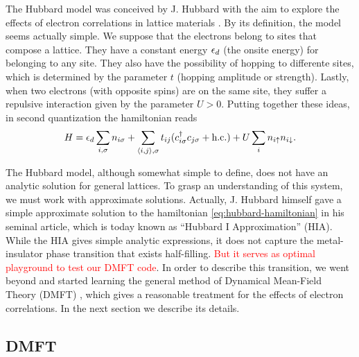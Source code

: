 \documentclass[12pt]{report}
\newcommand{\ALERT}[1]{\textcolor{red}{#1}}
\begin{document}
The Hubbard model was conceived by J. Hubbard with the aim to explore the effects of electron correlations in lattice materials \cite{hubbard1963}. By its definition, the model seems actually simple. We suppose that the electrons belong to sites that compose a lattice. They have a constant energy $\epsilon_d$ (the onsite energy) for belonging to any site. They also have the possibility of hopping to differente sites, which is determined by the parameter $t$ (hopping amplitude or strength). Lastly, when two electrons (with opposite spins) are on the same site, they suffer a repulsive interaction given by the parameter $U > 0$. %
Putting together these ideas, in second quantization the hamiltonian reads
\begin{equation} \label{eq:hubbard-hamiltonian}
H = \epsilon_d \sum_{i, {\sigma}} n_{i{\sigma}} +  \sum_{\left\langle i , j \right\rangle, {\sigma}} t_{ij} (c_{i{\sigma}}^\dagger c_{j{\sigma}} + {\text{h.c.}})
+ U \sum_{i} n_{i{\uparrow}} n_{i{\downarrow}}.
\end{equation}



The Hubbard model, although somewhat simple to define, does not have an analytic solution for general lattices. To grasp an understanding of this system, we must work with approximate solutions. Actually, J. Hubbard himself gave a simple approximate solution to the hamiltonian \ref{eq:hubbard-hamiltonian} in his seminal article, which is today known as ``Hubbard I Approximation'' (HIA). While the HIA gives simple analytic expressions, it does not capture the metal-insulator phase transition that exists half-filling. \ALERT{But it serves as optimal playground to test our DMFT code}.
 In order to describe this transition, we went beyond and started learning the general method of Dynamical Mean-Field Theory (DMFT) \cite{georges1996}, which gives a reasonable treatment for the effects of electron correlations. In the next section we describe its details.

\subsection{DMFT} \label{sec:dmft}
\end{document}
